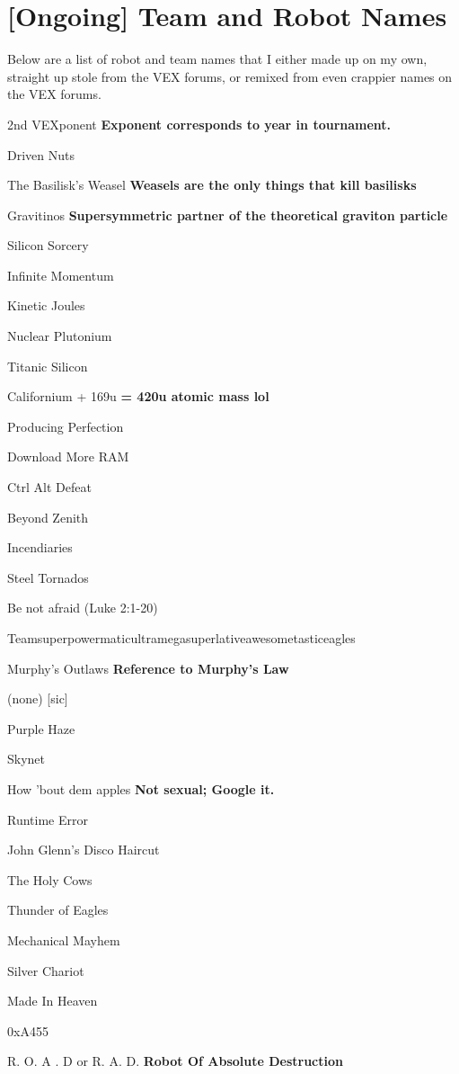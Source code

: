 \section{[Ongoing] Team and Robot Names}

Below are a list of robot and team names that I either made up on my own, straight up stole from the VEX forums, or remixed from even crappier names on the VEX forums.


2nd VEXponent \textbf{Exponent corresponds to year in tournament.}

Driven Nuts

The Basilisk’s Weasel \textbf{Weasels are the only things that kill basilisks}

Gravitinos \textbf{Supersymmetric partner of the theoretical graviton particle}

Silicon Sorcery

Infinite Momentum

Kinetic Joules

Nuclear Plutonium

Titanic Silicon

Californium + 169u \textbf{= 420u atomic mass lol}

Producing Perfection

Download More RAM

Ctrl Alt Defeat

Beyond Zenith

Incendiaries

Steel Tornados

Be not afraid (Luke 2:1-20)

Teamsuperpowermaticultramegasuperlativeawesometasticeagles

Murphy’s Outlaws \textbf{Reference to Murphy's Law}

(none) [sic]

Purple Haze

Skynet

How 'bout dem apples \textbf{Not sexual; Google it.}

Runtime Error

John Glenn’s Disco Haircut

The Holy Cows

Thunder of Eagles

Mechanical Mayhem

Silver Chariot

Made In Heaven

0xA455

R. O. A . D  or R. A. D. \textbf{Robot Of Absolute Destruction}
